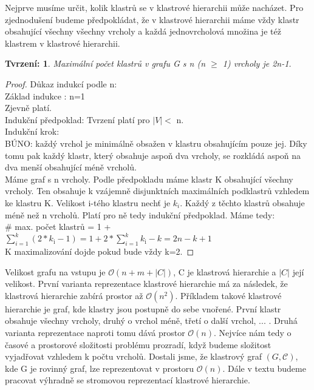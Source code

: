 \documentclass[12pt,a4report]{report}
\newtheorem{tvr}{Tvrzení: }[chapter]
\begin{document}
Nejprve musíme určit, kolik klastrů se v klastrové hierarchii může nacházet.
Pro zjednodušení budeme předpokládat, že v klastrové hierarchii máme vždy klastr obsahující všechny všechny vrcholy a každá jednovrcholová množina je též klastrem v klastrové hierarchii.
\begin{tvr}
Maximální počet klastrů v grafu G s n (n $\geq$ 1) vrcholy je 2n-1.
\end{tvr}
\begin{proof}
Důkaz indukcí podle n: \\
Základ indukce : n=1 \\
Zjevně platí. \\
Indukční předpoklad: Tvrzení platí pro $|V| <$ n.\\
Indukční krok:  \\
BÚNO: každý vrchol je minimálně obsažen v klastru obsahujícím pouze jej.
Díky tomu pak každý klastr, který obsahuje aspoň dva vrcholy, se rozkládá aspoň na dva menší obsahující méně vrcholů. \\
Máme graf s n vrcholy. Podle předpokladu máme klastr K obsahující všechny vrcholy. Ten obsahuje k vzájemně disjunktních maximálních podklastrů vzhledem ke klastru K. Velikost i-tého klastru nechť je $k_i$. Každý z těchto klastrů obsahuje méně než n vrcholů. Platí pro ně tedy indukční předpoklad. Máme tedy: \\
$\#$ max. počet klastrů = 1 + $\sum\limits_{i=1}^k (2*k_{\text{i}}-1) = 1 + 2*\sum\limits_{i=1}^k k_{\text{i}} - k = 2n - k + 1 $\\
K maximalizování dojde pokud bude vždy k=2.
\end{proof}

Velikost grafu na vstupu je  $\mathcal{O}(n+m+|C|)$, C je klastrová hierarchie a $|C|$ její velikost. 
První varianta reprezentace klastrové hierarchie má za následek, že klastrová hierarchie zabírá prostor až $\mathcal{O}(n^2)$. Příkladem takové klastrové hierarchie je graf, kde klastry jsou postupně do sebe vnořené. První klastr obsahuje všechny vrcholy, druhý o vrchol méně, třetí o další vrchol, ... .
Druhá varianta reprezentace naproti tomu dává prostor $\mathcal{O}(n)$. Nejvíce nám tedy o časové a prostorové složitosti problému prozradí, když budeme složitost vyjadřovat vzhledem k počtu vrcholů. Dostali jsme, že klastrový graf $(G,\mathcal C )$, kde G je rovinný graf, lze reprezentovat v prostoru $\mathcal O (n)$. Dále v textu budeme pracovat výhradně se stromovou reprezentací klastrové hierarchie.
\end{document}
